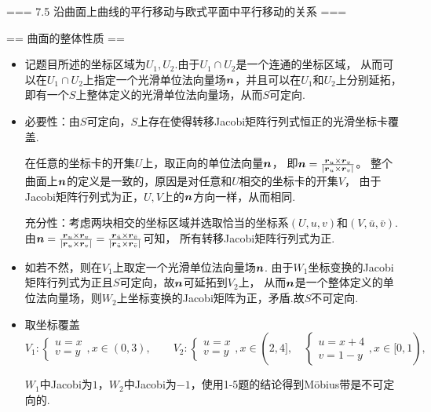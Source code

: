 === 7.5 沿曲面上曲线的平行移动与欧式平面中平行移动的关系 ===

== 曲面的整体性质 ==

\begin{itemize}
\item[1-3] 记题目所述的坐标区域为$U_1,U_2$.由于$U_1\cap U_2$是一个连通的坐标区域，
从而可以在$U_1\cap U_2$上指定一个光滑单位法向量场$\boldsymbol{n}$，并且可以在$U_1$和$U_2$上分别延拓，
即有一个$S$上整体定义的光滑单位法向量场，从而$S$可定向.

\item[1-4] 必要性：由$S$可定向，$S$上存在使得转移Jacobi矩阵行列式恒正的光滑坐标卡覆盖.

在任意的坐标卡的开集$U$上，取正向的单位法向量$\boldsymbol{n}$，
即$\boldsymbol{n}=\frac{\boldsymbol{r}_u\times\boldsymbol{r}_v}{|\boldsymbol{r}_u\times\boldsymbol{r}_v|}$。
整个曲面上$\boldsymbol{n}$的定义是一致的，原因是对任意和$U$相交的坐标卡的开集$V$，
由于Jacobi矩阵行列式为正，$U,V$上的$\boldsymbol{n}$方向一样，从而相同.

充分性：考虑两块相交的坐标区域并选取恰当的坐标系$(U,u,v)$和$(V,\bar{u},\bar{v})$.
由$\boldsymbol{n}=\frac{\boldsymbol{r}_u\times \boldsymbol{r}_v}{|\boldsymbol{r}_u\times \boldsymbol{r}_v|}
=\frac{\boldsymbol{r}_{\bar{u}}\times \boldsymbol{r}_{\bar{v}}}{|\boldsymbol{r}_{\bar{u}}\times \boldsymbol{r}_{\bar{v}}|}$可知，
所有转移Jacobi矩阵行列式为正.

\item[1-5] 如若不然，则在$V_1$上取定一个光滑单位法向量场$\boldsymbol{n}$.
由于$W_1$坐标变换的Jacobi矩阵行列式为正且$S$可定向，故$\boldsymbol{n}$可延拓到$V_2$上，
从而$\boldsymbol{n}$是一个整体定义的单位法向量场，则$W_2$上坐标变换的Jacobi矩阵为正，矛盾.故$S$不可定向.

\item[1-6] 取坐标覆盖
$$V_1:\begin{cases}u=x\\v=y\end{cases},x\in(0,3),\qquad
V_2:\begin{cases}u=x\\v=y\end{cases},x\in(2,4],\quad
\begin{cases}u=x+4\\v=1-y\end{cases},x\in[0,1),\quad$$
$W_1$中Jacobi为$1$，$W_2$中Jacobi为$-1$，使用1-5题的结论得到Möbius带是不可定向的.


\end{itemize}
